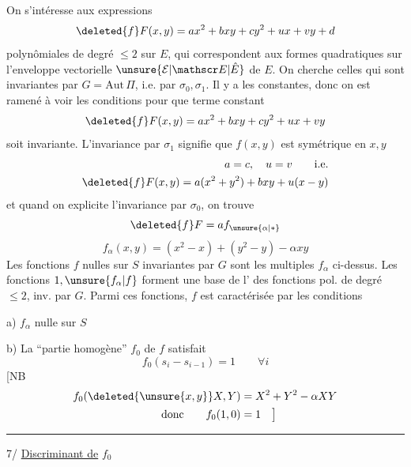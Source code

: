 On s'intéresse aux expressions
\[
\deleted{f}F(x,y)=ax^2+bxy+cy^2+ux+vy+d
\]
polynômiales de degré $\le2$ sur $E$, qui correspondent aux formes quadratiques sur l'enveloppe vectorielle $\unsure{\mathcal E|\mathscr E|\hat E}$ de $E$. On cherche celles qui sont invariantes par $G=\mathrm{Aut}\,\Pi$, i.e. par $\sigma_0,\sigma_1$. Il y a les constantes, donc on est ramené à voir les conditions pour que   terme constant
\[
\deleted{f}F(x,y)=ax^2+bxy+cy^2+ux+vy
\]
soit invariante. L'invariance par $\sigma_1$ signifie que $f(x,y)$ est symétrique en $x,y$
\[
\begin{aligned}
a=c,\quad u=v\qquad \text{i.e.}\\
\deleted{f}F(x,y)=a(x^2+y^2)+bxy+u(x-y)
\end{aligned}
\]
et quand on explicite l'invariance par $\sigma_0$, on trouve
\[
\deleted{f}F=a f_{\unsure{\alpha|*}}
\]
\[
\boxed{f_\alpha(x,y)=(x^2-x)+(y^2-y)-\alpha xy}
\]
Les fonctions $f$  nulles sur $S$ invariantes par $G$ sont les multiples  $f_\alpha$ ci-dessus.
Les fonctions $1,\unsure{f_\alpha|f}$ forment une base  de l' des fonctions pol. de degré $\le2$, inv. par $G$.
Parmi ces fonctions, $f$ est caractérisée par les  conditions

a) $f_\alpha$ nulle sur $S$

b) La ``partie homogène'' $f_0$ de $f$ satisfait
\[
f_0(s_i-s_{i-1})=1\qquad\forall i
\]
[NB
\[
\begin{aligned}
f_0(\deleted{\unsure{x,y}}X,Y)&=X^2+Y^2-\alpha XY\\
\text{donc}\qquad f_0(1,0)&=1\quad\big]
\end{aligned}
\]
\begin{center}\rule{1.4cm}{.35pt}\end{center}
7/  \uline{Discriminant de} $f_0$

